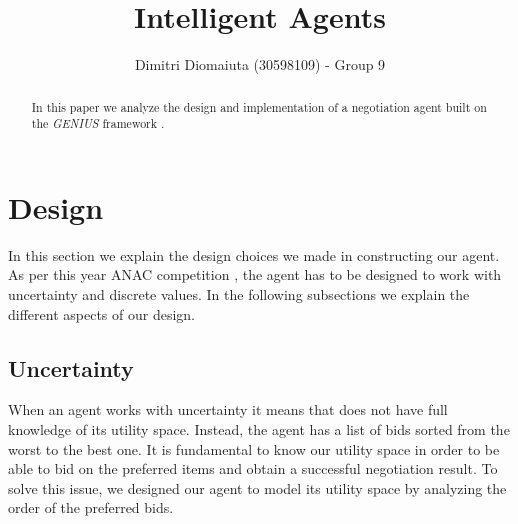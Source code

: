\documentclass[runningheads]{llncs}
\begin{document}
%
\title{Intelligent Agents}
%
%
\author{Dimitri Diomaiuta (30598109) - Group 9}
%
%
%
\maketitle              %
%
\begin{abstract}
In this paper we analyze the design and implementation of a
negotiation agent built on the \textit{GENIUS} framework \cite{genius}.
\end{abstract}
%
%
%

\section{Design}
In this section we explain the design choices we made in constructing
our agent. As per this year ANAC competition \cite{anac}, the agent
has to be designed to work with uncertainty and discrete values. In
the following subsections we explain the different aspects of our
design.

\subsection{Uncertainty}
When an agent works with uncertainty it means that does not have full
knowledge of its utility space. Instead, the agent has a list of bids
sorted from the worst to the best one. It is fundamental to know our
utility space in order to be able to bid on the preferred items and
obtain a successful negotiation result. To solve this issue, we designed
our agent to model its utility space by analyzing the order of the
preferred bids.
\end{document}
